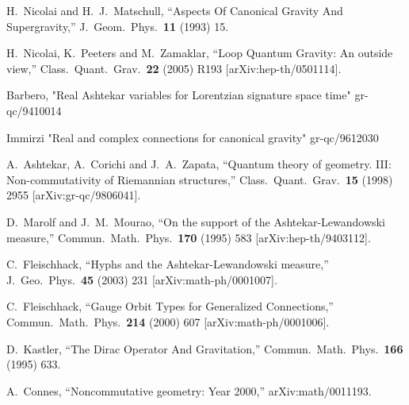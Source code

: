 \documentclass[12pt]{article}
\begin{document}
\begin{thebibliography}{99}
  H.~Nicolai and H.~J.~Matschull,
  ``Aspects Of Canonical Gravity And Supergravity,''
  J.\ Geom.\ Phys.\  {\bf 11} (1993) 15.

  H.~Nicolai, K.~Peeters and M.~Zamaklar,
  ``Loop Quantum Gravity: An outside view,''
  Class.\ Quant.\ Grav.\  {\bf 22} (2005) R193
  [arXiv:hep-th/0501114].



Barbero, "Real Ashtekar variables for Lorentzian signature space time"
gr-qc/9410014

Immirzi "Real and complex connections for canonical gravity" 
gr-qc/9612030



  A.~Ashtekar, A.~Corichi and J.~A.~Zapata,
  ``Quantum theory of geometry. III: Non-commutativity of Riemannian
  structures,''
  Class.\ Quant.\ Grav.\  {\bf 15} (1998) 2955
  [arXiv:gr-qc/9806041].


D.~Marolf and J.~M.~Mourao,
``On the support of the Ashtekar-Lewandowski measure,''
Commun.\ Math.\ Phys.\  {\bf 170} (1995) 583
[arXiv:hep-th/9403112].





  C.~Fleischhack,
  ``Hyphs and the Ashtekar-Lewandowski measure,''
J.\ Geo.\ Phys.\ {\bf 45} (2003) 231  
[arXiv:math-ph/0001007].


  C.~Fleischhack,
  ``Gauge Orbit Types for Generalized Connections,''
  Commun.\ Math.\ Phys.\  {\bf 214} (2000) 607
  [arXiv:math-ph/0001006].





  D.~Kastler,
  ``The Dirac Operator And Gravitation,''
  Commun.\ Math.\ Phys.\  {\bf 166} (1995) 633.



  A.~Connes,
  ``Noncommutative geometry: Year 2000,''
  arXiv:math/0011193.







\end{thebibliography}
\end{document}
